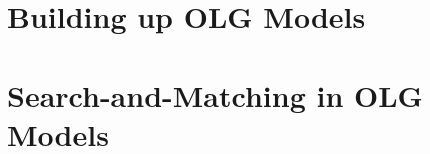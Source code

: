 \documentclass[11pt]{article}%
\begin{document}
\newpage
\section{Building up OLG Models}







\section{Search-and-Matching in OLG Models}


\newpage

\newpage




\newpage
\appendix


\end{document}
